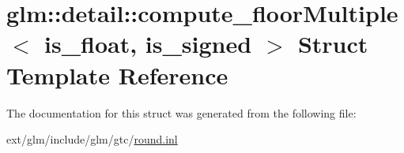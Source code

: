 \hypertarget{structglm_1_1detail_1_1compute__floor_multiple}{\section{glm\-:\-:detail\-:\-:compute\-\_\-floor\-Multiple$<$ is\-\_\-float, is\-\_\-signed $>$ Struct Template Reference}
\label{structglm_1_1detail_1_1compute__floor_multiple}
}


The documentation for this struct was generated from the following file\-:\begin{DoxyCompactItemize}
\item 
ext/glm/include/glm/gtc/\hyperlink{round_8inl}{round.\-inl}\end{DoxyCompactItemize}
